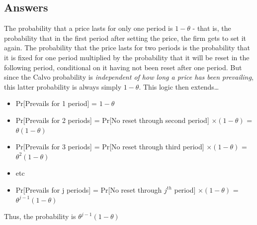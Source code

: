 \documentclass[authoryear,11pt]{elsarticle}
\begin{document}
\subsection*{Answers}
The probability that a price lasts for only one period is $1-\theta$ - that is, the probability that in the first period after setting the price, the firm gets to set it again. The probability that the price lasts for two periods is the probability that it is fixed for one period multiplied by the probability that it will be reset in the following period, conditional on it having not been reset after one period. But since the Calvo probability is \emph{independent of how long a price has been prevailing}, this latter probability is always simply $1-\theta$. This logic then extends\ldots
\begin{itemize}
\item	Pr[Prevails for 1 period] 	= $1-\theta$
\item	Pr[Prevails for 2 periods]	= Pr[No reset through second period] $\times(1-\theta)$ = $\theta(1-\theta)$
\item	Pr[Prevails for 3 periods]	= Pr[No reset through third period] $\times(1-\theta)$ = $\theta^{2}(1-\theta)$
\item	etc
\item	Pr[Prevails for j periods]	= Pr[No reset through $j^{th}$ period] $\times(1-\theta)$ = $\theta^{j-1}(1-\theta)$
\end{itemize}
Thus, the probability is $\theta^{j-1}(1-\theta)$
\end{document}
